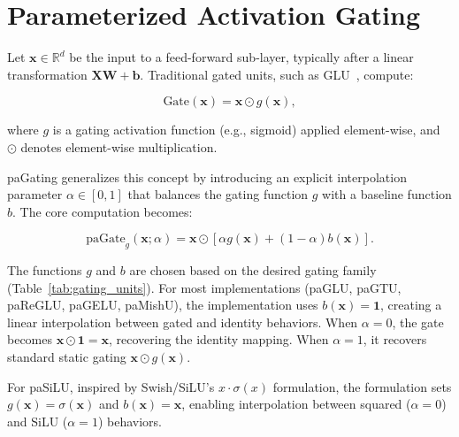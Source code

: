 \documentclass[lettersize,journal]{IEEEtran}
\begin{document}
\section{Parameterized Activation Gating}

Let $\mathbf{x} \in \mathbb{R}^d$ be the input to a feed-forward sub-layer, typically after a linear transformation $\mathbf{X}\mathbf{W} + \mathbf{b}$. Traditional gated units, such as GLU~\cite{dauphin2017language}, compute:

\begin{equation}
\text{Gate}(\mathbf{x}) = \mathbf{x} \odot g(\mathbf{x}),
\label{eq:traditional_gate}
\end{equation}

where $g$ is a gating activation function (e.g., sigmoid) applied element-wise, and $\odot$ denotes element-wise multiplication.

paGating generalizes this concept by introducing an explicit interpolation parameter $\alpha \in [0,1]$ that balances the gating function $g$ with a baseline function $b$. The core computation becomes:

\begin{equation}
\text{paGate}_g(\mathbf{x}; \alpha) = \mathbf{x} \odot [\alpha g(\mathbf{x}) + (1-\alpha) b(\mathbf{x})].
\label{eq:pagate_core}
\end{equation}

The functions $g$ and $b$ are chosen based on the desired gating family (Table~\ref{tab:gating_units}). For most implementations (paGLU, paGTU, paReGLU, paGELU, paMishU), the implementation uses $b(\mathbf{x}) = \mathbf{1}$, creating a linear interpolation between gated and identity behaviors. When $\alpha = 0$, the gate becomes $\mathbf{x} \odot \mathbf{1} = \mathbf{x}$, recovering the identity mapping. When $\alpha = 1$, it recovers standard static gating $\mathbf{x} \odot g(\mathbf{x})$.

For paSiLU, inspired by Swish/SiLU's $x \cdot \sigma(x)$ formulation, the formulation sets $g(\mathbf{x}) = \sigma(\mathbf{x})$ and $b(\mathbf{x}) = \mathbf{x}$, enabling interpolation between squared ($\alpha = 0$) and SiLU ($\alpha = 1$) behaviors.
\end{document}
